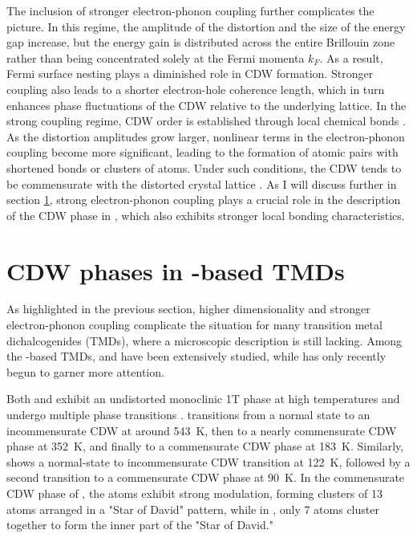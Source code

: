 The inclusion of stronger electron-phonon coupling further complicates the picture.
In this regime, the amplitude of the distortion and the size of the energy gap increase, but the energy gain is distributed across the entire Brillouin zone rather than being concentrated solely at the Fermi momenta $k_F$.
As a result, Fermi surface nesting plays a diminished role in CDW formation.
Stronger coupling also leads to a shorter electron-hole coherence length, which in turn enhances phase fluctuations of the CDW relative to the underlying lattice.
In the strong coupling regime, CDW order is established through local chemical bonds \cite{rossnagel_origin_2011, whangbo_analogies_1992, mcmillan_microscopic_1977, haas_chemical_1978, inglesfield_bonding_1980}.
As the distortion amplitudes grow larger, nonlinear terms in the electron-phonon coupling become more significant, leading to the formation of atomic pairs with shortened bonds or clusters of atoms.
Under such conditions, the CDW tends to be commensurate with the distorted crystal lattice \cite{rossnagel_origin_2011}.
As I will discuss further in section \ref{sec:cdw_tate2}, strong electron-phonon coupling plays a crucial role in the description of the CDW phase in , which also exhibits stronger local bonding characteristics.

\section{CDW phases in -based TMDs}
\label{sec:cdw_tate2}

As highlighted in the previous section, higher dimensionality and stronger electron-phonon coupling complicate the situation for many transition metal dichalcogenides (TMDs), where a microscopic description is still lacking.
Among the -based TMDs,  and  have been extensively studied, while  has only recently begun to garner more attention.

Both  and  exhibit an undistorted monoclinic 1T phase at high temperatures and undergo multiple phase transitions \cite{pouget_structural_2024,lin_evidence_2022}.
 transitions from a normal state to an incommensurate CDW at around \qty{543}{\kelvin}, then to a nearly commensurate CDW phase at \qty{352}{\kelvin}, and finally to a commensurate CDW phase at \qty{183}{\kelvin}.
Similarly,  shows a normal-state to incommensurate CDW transition at \qty{122}{\kelvin}, followed by a second transition to a commensurate CDW phase at \qty{90}{\kelvin}.
In the commensurate CDW phase of , the  atoms exhibit strong modulation, forming clusters of 13 atoms arranged in a "Star of David" pattern, while in , only 7 atoms cluster together to form the inner part of the "Star of David."

